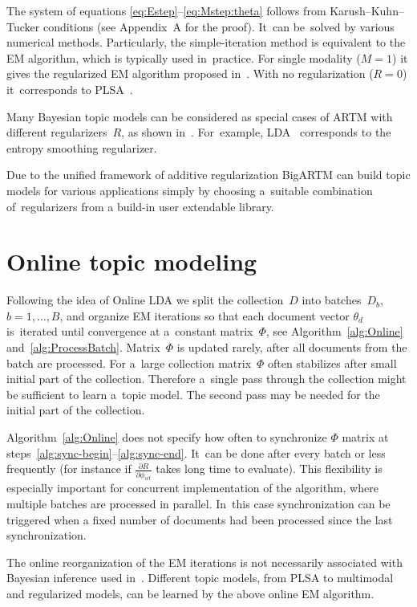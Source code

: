 \documentclass[russian]{llncs}
\begin{document}
The system of equations \eqref{eq:Estep}--\eqref{eq:Mstep:theta}
follows from Karush--Kuhn--Tucker conditions (see Appendix~A for the proof).
It~can be~solved by various numerical methods.
Particularly,
the simple-iteration method is equivalent to the EM algorithm,
which is typically used in~practice.
For single modality (${M=1}$) it gives the regularized EM algorithm
proposed in~\cite{voron14dan-eng}.
With no regularization (${R=0}$) it~corresponds to PLSA~\cite{hofmann99plsi}.

Many Bayesian topic models can be considered
as special cases of ARTM with different regularizers~$R$,
as shown in~\cite{voron14aist,voron14mlj}.
For~example,
LDA~\cite{blei03latent} corresponds to the entropy smoothing regularizer.

Due to the unified framework of additive regularization
BigARTM can build topic models for various applications
simply by choosing a~suitable combination of~regularizers
from a build-in user extendable library.

\section{Online topic modeling}
\label{sec:Online}

Following the idea of Online LDA \cite{hoffman10online}
we split the collection~$D$ into batches~$D_b$, ${b=1,\dots,B}$,
and organize EM iterations so that
each document vector $\theta_d$ is~iterated until convergence at a~constant matrix~$\Phi$,
see Algorithm~\ref{alg:Online} and~\ref{alg:ProcessBatch}.
Matrix~$\Phi$ is updated rarely, after all documents from the batch are processed.
For a~large collection
matrix~$\Phi$ often stabilizes after small initial part of the collection.
Therefore a~single pass through the collection might be sufficient to learn a~topic model.
The second pass may be needed for the initial part of the collection.

Algorithm~\ref{alg:Online} does not specify how often to synchronize $\Phi$ matrix
at steps~\ref{alg:sync-begin}--\ref{alg:sync-end}.
It~can be done after every batch or less frequently
(for instance if $\frac{\partial R}{\partial \phi_{wt}}$ takes long time to evaluate).
This flexibility is especially important for concurrent implementation of the algorithm,
where multiple batches are processed in parallel.
In~this case synchronization can be triggered when a fixed number of documents had been processed since the last synchronization.

The online reorganization of the EM iterations
is not necessarily associated with Bayesian inference used in~\cite{hoffman10online}.
Different topic models, from PLSA to multimodal and regularized models,
can be learned by the above online EM algorithm.
\end{document}
